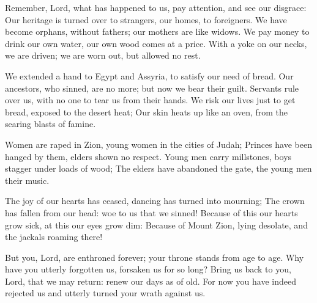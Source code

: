 Remember, Lord, what has happened to us,
    pay attention, and see our disgrace:
Our heritage is turned over to strangers,
    our homes, to foreigners.
We have become orphans, without fathers;
    our mothers are like widows.
We pay money to drink our own water,
    our own wood comes at a price.
With a yoke on our necks, we are driven;
    we are worn out, but allowed no rest.

We extended a hand to Egypt and Assyria,
    to satisfy our need of bread.
Our ancestors, who sinned, are no more;
    but now we bear their guilt.
Servants rule over us,
    with no one to tear us from their hands.
We risk our lives just to get bread,
    exposed to the desert heat;
Our skin heats up like an oven,
    from the searing blasts of famine.

Women are raped in Zion,
    young women in the cities of Judah;
Princes have been hanged by them,
    elders shown no respect.
Young men carry millstones,
    boys stagger under loads of wood;
The elders have abandoned the gate,
    the young men their music.

The joy of our hearts has ceased,
    dancing has turned into mourning;
The crown has fallen from our head:
    woe to us that we sinned!
Because of this our hearts grow sick,
    at this our eyes grow dim:
Because of Mount Zion, lying desolate,
    and the jackals roaming there!

But you, Lord, are enthroned forever;
    your throne stands from age to age.
Why have you utterly forgotten us,
    forsaken us for so long?
Bring us back to you, Lord, that we may return:
    renew our days as of old.
For now you have indeed rejected us
    and utterly turned your wrath against us.
